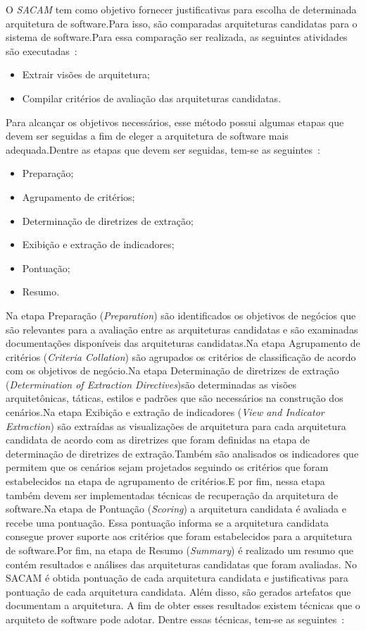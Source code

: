 O \emph{\acrfull{SACAM}} tem como objetivo fornecer justificativas para escolha de determinada arquitetura de software.Para isso, são comparadas arquiteturas candidatas para o sistema de software.Para essa comparação ser realizada, as seguintes atividades são executadas~\cite{SACAM}:

\begin{itemize}
    \item Extrair visões de arquitetura;
    \item Compilar critérios de avaliação das arquiteturas candidatas.
\end{itemize}

Para alcançar os objetivos necessários, esse  método possui algumas etapas que devem ser seguidas a fim de eleger a  arquitetura de software mais adequada.Dentre as etapas que devem ser seguidas, tem-se as seguintes~\cite{SACAM}:

\begin{itemize}
    \item Preparação;
    \item Agrupamento de critérios;
    \item Determinação de diretrizes de extração;
    \item Exibição e extração de indicadores;
    \item Pontuação;
    \item Resumo.
\end{itemize}

Na etapa Preparação (\emph{Preparation}) são identificados os objetivos de negócios que são relevantes para a avaliação entre as arquiteturas candidatas e são examinadas documentações disponíveis das arquiteturas candidatas.Na etapa Agrupamento de critérios (\emph{Criteria Collation}) são agrupados os critérios de classificação de acordo com os objetivos de negócio.Na etapa Determinação de diretrizes de extração (\emph{Determination of Extraction Directives})são determinadas as visões arquitetônicas, táticas, estilos e padrões que são necessários na construção dos cenários.Na etapa Exibição e extração de indicadores (\emph{View and Indicator Extraction}) são extraídas as visualizações de arquitetura para cada arquitetura candidata de acordo com as diretrizes que foram definidas na etapa de determinação de diretrizes de extração.Também são analisados os indicadores que permitem que os cenários sejam projetados seguindo os critérios que foram estabelecidos na etapa de agrupamento de critérios.E por fim, nessa etapa também devem ser implementadas técnicas de recuperação da arquitetura de software.Na etapa de Pontuação (\emph{Scoring}) a arquitetura candidata é avaliada e recebe uma pontuação. Essa pontuação informa se a arquitetura candidata consegue prover suporte aos critérios que foram estabelecidos para a arquitetura de software.Por fim, na etapa de Resumo (\emph{Summary}) é realizado um resumo que contém resultados e análises das arquiteturas candidatas que foram avaliadas.
No SACAM é obtida  pontuação de cada arquitetura candidata e justificativas para pontuação de cada arquitetura candidata. Além disso, são gerados artefatos que documentam a arquitetura. A fim de obter esses resultados existem técnicas que o arquiteto de software pode adotar. Dentre essas técnicas, tem-se as seguintes~\cite{SACAM}:

